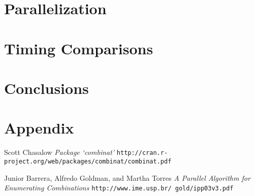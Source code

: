 \documentclass[12pt]{article}
\begin{document}
{\section{Parallelization}







\section{Timing Comparisons}



\section{Conclusions}




\newpage

\appendix

\section{Appendix}



\newpage


\begin{thebibliography}{9}
Scott Chasalow
\textit{Package `combinat'}
\texttt{http://cran.r-project.org/web/packages/combinat/combinat.pdf}

Junior Barrera, Alfredo Goldman, and Martha Torres
\textit{A Parallel Algorithm for Enumerating Combinations}
\texttt{http://www.ime.usp.br/~gold/ipp03v3.pdf}
 

\end{thebibliography}


}
\end{document}
